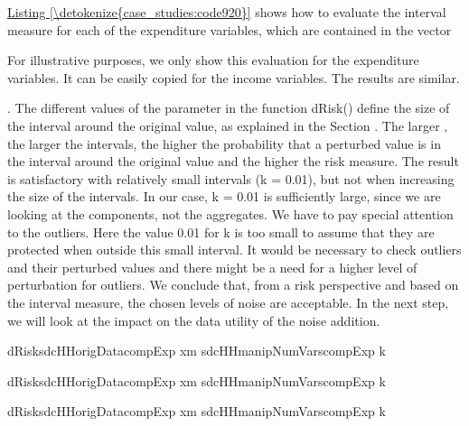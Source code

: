 \documentclass[letterpaper,10pt,english]{sphinxmanual}
\begin{document}
\hyperref[\detokenize{case_studies:code920}]{Listing \ref{\detokenize{case_studies:code920}}} shows how to evaluate the interval measure for each of the
expenditure variables, which are contained in the vector
\begin{footnote}[2]\sphinxAtStartFootnote
For illustrative purposes, we only show this evaluation for the
expenditure variables. It can be easily copied for the income
variables. The results are similar.
%
\end{footnote}. The different values of the parameter
 in the function dRisk() define the size of the interval around the
original value, as explained in the Section .
The larger , the
larger the intervals, the higher the probability that a perturbed value
is in the interval around the original value and the higher the risk
measure. The result is satisfactory with relatively small intervals (k =
0.01), but not when increasing the size of the intervals. In our case, k
= 0.01 is sufficiently large, since we are looking at the components,
not the aggregates. We have to pay special attention to the outliers.
Here the value 0.01 for k is too small to assume that they are protected
when outside this small interval. It would be necessary to check
outliers and their perturbed values and there might be a need for a
higher level of perturbation for outliers. We conclude that, from a risk
perspective and based on the interval measure, the chosen levels of
noise are acceptable. In the next step, we will look at the impact on
the data utility of the noise addition.

\def\sphinxLiteralBlockLabel{\label{\detokenize{case_studies:code920}}}
%
\begin{sphinxVerbatim}[commandchars=\\\{\},numbers=left,firstnumber=1,stepnumber=1]
dRisksdcHHorigData\PYG{p}{[}compExp\PYG{p}{]} xm  sdcHHmanipNumVars\PYG{p}{[}compExp\PYG{p}{]} k  
\PYG{p}{[}\PYG{p}{]} 

dRisksdcHHorigData\PYG{p}{[}compExp\PYG{p}{]} xm  sdcHHmanipNumVars\PYG{p}{[}compExp\PYG{p}{]} k  
\PYG{p}{[}\PYG{p}{]} 

dRisksdcHHorigData\PYG{p}{[}compExp\PYG{p}{]} xm  sdcHHmanipNumVars\PYG{p}{[}compExp\PYG{p}{]} k  
\PYG{p}{[}\PYG{p}{]} 
\end{sphinxVerbatim}
\end{document}
